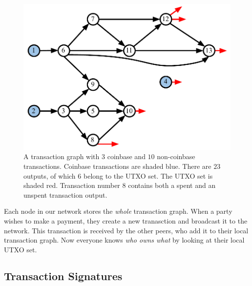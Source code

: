 \begin{figure}[h]
    \centering
    \includegraphics[width=0.65 \columnwidth,keepaspectratio]{figures/utxo-tx-graph.pdf}
    \caption{A transaction graph with $3$ coinbase and $10$ non-coinbase transactions.
             Coinbase transactions are shaded blue.
             There are $23$ outputs, of which $6$ belong to the UTXO set.
             The UTXO set is shaded red. Transaction number $8$ contains both
             a spent and an unspent transaction output.}
    \label{fig.utxo-tx-graph}
\end{figure}

Each node in our network stores the \emph{whole} transaction graph. When a party wishes to make
a payment, they create a new tranasction and broadcast it to the network. This transaction is
received by the other peers, who add it to their local transaction graph. Now everyone
knows \emph{who owns what} by looking at their local UTXO set.

\subsection*{Transaction Signatures}

